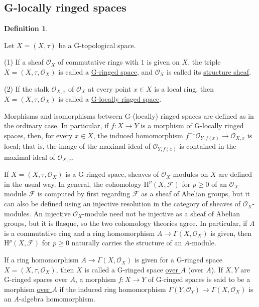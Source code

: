 \documentclass[a4paper,12pt, dvipdfmx]{jsbook}
\def\O{\mathscr{O}}
\def\H{\mathrm{H}}
\theoremstyle{plain}
\theoremstyle{definition}
\newtheorem{dfn}[thm]{\bfseries Definition}
\begin{document}
\subsection{G-locally ringed spaces}\label{sub-Glocallyringedspace}
\begin{dfn}\label{dfn-Glocallyringedspace}{\rm 
Let $X=(X,\tau)$ be a G-topological space.

(1) If a sheaf $\O_X$ of commutative rings with $1$ is given on $X$, the triple $X=(X,\tau,\O_X)$ is called a \underline{G-ringed space}, and $\O_X$ is called its \underline{structure sheaf}.

(2) If the stalk $\O_{X,x}$ of $\O_X$ at every point $x\in X$ is a local ring, then $X=(X,\tau,\O_X)$ is called a \underline{G-locally ringed space}.}
\end{dfn}

Morphisms and isomorphisms between G-(locally) ringed spaces are defined as in the ordinary case.
In particular, if $f\colon X\rightarrow Y$ is a morphism of G-locally ringed spaces, then, for every $x\in X$, the induced homomorphism $f^{-1}\O_{Y,f(x)}\rightarrow\O_{X,x}$ is local; that is, the image of the maximal ideal of $\O_{Y,f(x)}$ is contained in the maximal ideal of $\O_{X,x}$.

If $X=(X,\tau,\O_X)$ is a G-ringed space, sheaves of $\O_X$-modules on $X$ are defined in the usual way.
In general, the cohomology $\H^p(X,\mathscr{F})$ for $p\geq 0$ of an $\O_X$-module $\mathscr{F}$ is computed by first regarding $\mathscr{F}$ as a sheaf of Abelian groups, but it can also be defined using an injective resolution in the category of sheaves of $\O_X$-modules.
An injective $\O_X$-module need not be injective as a sheaf of Abelian groups, but it is flasque, so the two cohomology theories agree.
In particular, if $A$ is a commutative ring and a ring homomorphism $A\rightarrow\Gamma(X,\O_X)$ is given, then $\H^p(X,\mathscr{F})$ for $p\geq 0$ naturally carries the structure of an $A$-module.

If a ring homomorphism $A\rightarrow\Gamma(X,\O_X)$ is given for a G-ringed space $X=(X,\tau,\O_X)$, then $X$ is called a G-ringed space \underline{over $A$} (over $A$).
If $X,Y$ are G-ringed spaces over $A$, a morphism $f\colon X\rightarrow Y$ of G-ringed spaces is said to be a morphism \underline{over $A$} if the induced ring homomorphism $\Gamma(Y,\O_Y)\rightarrow\Gamma(X,\O_X)$ is an $A$-algebra homomorphism.
\end{document}
